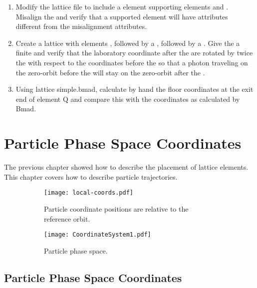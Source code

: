 \documentclass{hitec}     %
\newcommand{\Section}[1]{\section{#1}\vspace*{-1ex}}
\begin{document}
{\begin{enumerate}[label=\thesection.\arabic{enumi}]
\item
Modify the lattice file  to include a  element supporting elements 
and . Misalign the  and verify that a supported element will have 
attributes different from the misalignment attributes.
%
\item
Create a lattice with elements , followed by a , followed by a .
Give the  a finite  and verify that the laboratory coordinate after the
 are rotated by twice the  with respect to the coordinates before the
 so that a photon traveling on the zero-orbit before the  will stay on the
zero-orbit after the .
%
\item
Using lattice simple.bmad, calculate by hand the floor coordinates at the exit end of element Q and compare this with the coordinates as calculated by Bmad.
\end{enumerate}

\newpage

\Section{Particle Phase Space Coordinates}
\label{s:phase.space}

The previous chapter showed how to describe the placement of lattice elements. This chapter
covers how to describe particle trajectories. 

\begin{figure}[tb]
  \centering
  \begin{subfigure}[t]{0.48\textwidth}
    \texttt{[image: local-coords.pdf]}
    \caption{Particle coordinate positions are relative to the reference orbit.}
    \label{f:part.coords}
  \end{subfigure}
  \hfil
  \begin{subfigure}[t]{0.48\textwidth}
    \texttt{[image: CoordinateSystem1.pdf]}
    \caption{Particle phase space.}
    \label{f:phase.space}
  \end{subfigure}
  \caption{}
\end{figure}

\subsection{Particle Phase Space Coordinates}
\label{s:phase.space.sub}

}
\end{document}
